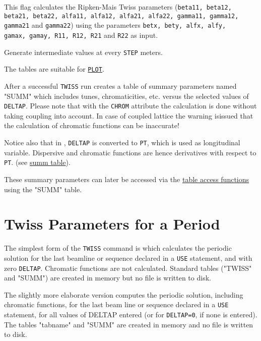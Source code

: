 \begin{madlist}
   This flag calculates the Ripken-Mais Twiss
  parameters (\texttt{beta11, beta12, beta21, beta22, alfa11, alfa12,
  alfa21, alfa22, gamma11, gamma12, gamma21} and \texttt{gamma22}) using
  the parameters \texttt{betx, bety, alfx, alfy, \\ gamax, gamay, R11, R12,
    R21} and \texttt{R22} as input.  

   Generate intermediate values at every \texttt{STEP} meters.

\end{madlist}

The tables are suitable for \hyperref[chap:plot]{\texttt{PLOT}}.

After a successful \texttt{TWISS} run \madx creates a 
table of summary parameters named "SUMM" which includes tunes,
chromaticities, etc. versus the selected values of \texttt{DELTAP}.
Please note that with the \texttt{CHROM} attribute the calculation is done without
taking coupling into account. In case of coupled lattice the warning isissued that
the calculation of chromatic functions can be inaccurate!

Notice also that in \madx, \texttt{DELTAP} is converted to \texttt{PT},
which is used as longitudinal variable. 
Dispersive and chromatic functions are hence derivatives with
respect to \texttt{PT}. (see \hyperref[subsec:tables-summ]{summ table}). 

These summary parameters can later be accessed via the 
\hyperref[chap:tables]{table access functions} using the "SUMM" table.  

\section{Twiss Parameters for a Period}
\label{sec:twissperiod}

The simplest form of the \texttt{TWISS} command is
which calculates the periodic solution for the last beamline or sequence
declared in a \texttt{USE} statement, and with zero \texttt{DELTAP}.
Chromatic functions are not calculated. 
Standard tables ("TWISS" and "SUMM") are created in memory but no file
is written to disk. 

The slightly more elaborate version 
computes the periodic solution, including chromatic functions, for the last beam
line or sequence declared in a \texttt{USE} statement, for all values of
DELTAP entered (or for \texttt{DELTAP=0}, if none is entered). 
The tables "tabname" and "SUMM" are created in memory and no file is
written to disk. 

